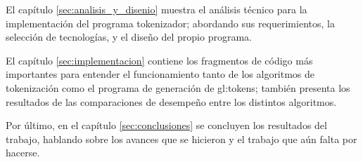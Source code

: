El capítulo \ref{sec:analisis_y_disenio} muestra el análisis técnico para
la implementación del programa tokenizador; abordando sus requerimientos,
la selección de tecnologías, y el diseño del propio programa.

El capítulo \ref{sec:implementacion} contiene los fragmentos de código más
importantes para entender el funcionamiento tanto de los algoritmos de
tokenización como el programa de generación de \glspl{gl:token}; también
presenta los resultados de las comparaciones de desempeño entre los
distintos algoritmos.

Por último, en el capítulo \ref{sec:conclusiones} se concluyen los resultados
del trabajo, hablando sobre los avances que se hicieron y el trabajo que aún
falta por hacerse.
